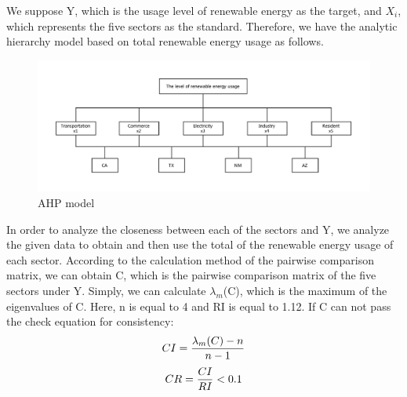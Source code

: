 \documentclass[a4paper,11pt]{article}
\begin{document}
\par We suppose Y, which is the usage level of renewable energy as the target, and $X_i$, which represents the five sectors as the standard. Therefore, we have the analytic hierarchy model based on total renewable energy usage as follows.\cite{6}

\begin{figure}[H] 
    \centering 
    \includegraphics[width=1.0\textwidth]{./Pic/AHP.pdf}
    \caption{AHP model}
\end{figure}

\par In order to analyze the closeness between each of the sectors and Y, we analyze the given data to obtain and then use the total of the renewable energy usage of each sector. According to the calculation method of the pairwise comparison matrix, we can obtain C, which is the pairwise comparison matrix of the five sectors under Y. Simply, we can calculate $\lambda_m$(C), which is the maximum of the eigenvalues of C. Here, n is equal to 4 and RI is equal to 1.12.\cite{6} If C can not pass the check equation for consistency:
\begin{equation}
    \centering
    CI=\frac{ \lambda_m(C)-n }{ n-1 }
\end{equation}
\begin{equation}
        \centering
    CR=\frac{ CI }{ RI }<0.1 
\end{equation}
\end{document}
